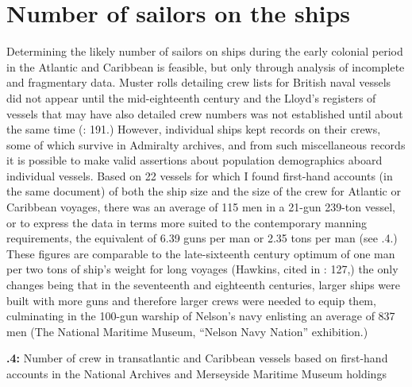 \section{\textbf{Number} \textbf{of} \textbf{sailors} \textbf{on} \textbf{the} \textbf{ships}}%

  Determining the likely number of sailors on ships during the early colonial period in the Atlantic and Caribbean is feasible, but only through analysis of incomplete and fragmentary data. Muster rolls detailing crew lists for British naval vessels did not appear until the mid-eighteenth century \citep[125]{Litter1999} and the Lloyd’s registers of vessels that may have also detailed crew numbers was not established until about the same time (\citealt{Litter1999}: 191.) However, individual ships kept records on their crews, some of which survive in Admiralty archives, and from such miscellaneous records it is possible to make valid assertions about population demographics aboard individual vessels. Based on 22 vessels for which I found first-hand accounts (in the same document) of both the ship size and the size of the crew for Atlantic or Caribbean voyages, there was an average of 115 men in a 21-gun 239-ton vessel, or to express the data in terms more suited to the contemporary manning requirements, the equivalent of 6.39 guns per man or 2.35 tons per man (see .4.) These figures are comparable to the late-sixteenth century optimum of one man per two tons of ship’s weight for long voyages (Hawkins, cited in \citealt{Bicheno2012}: 127,) the only changes being that in the seventeenth and eighteenth centuries, larger ships were built with more guns and therefore larger crews were needed to equip them, culminating in the 100-gun warship of Nelson’s navy enlisting an average of 837 men (The National Maritime Museum, “Nelson Navy Nation” exhibition.)

\textbf{.4:} Number of crew in transatlantic and Caribbean vessels based on first-hand accounts in the National Archives and Merseyside Maritime Museum holdings

